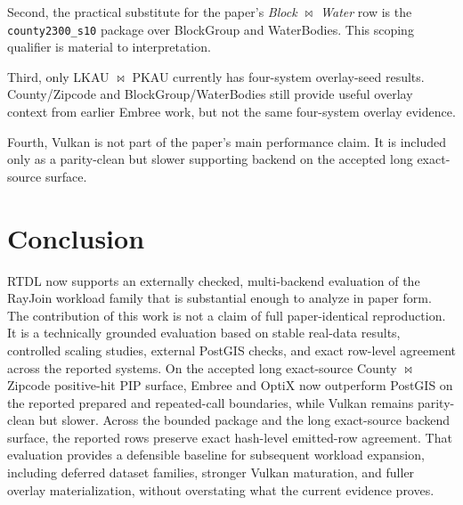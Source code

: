 \documentclass[conference]{IEEEtran}
\begin{document}
Second, the practical substitute for the paper's \textit{Block
$\bowtie$ Water} row is the \texttt{county2300\_s10} package over
BlockGroup and WaterBodies. This scoping qualifier is material to
interpretation.

Third, only LKAU $\bowtie$ PKAU currently has four-system overlay-seed
results. County/Zipcode and BlockGroup/WaterBodies still provide useful
overlay context from earlier Embree work, but not the same four-system overlay
evidence.

Fourth, Vulkan is not part of the paper's main performance claim. It is
included only as a parity-clean but slower supporting backend on the accepted
long exact-source surface.

\section{Conclusion}

RTDL now supports an externally checked, multi-backend evaluation of the
RayJoin workload family that is substantial enough to analyze in paper form.
The contribution of this work is not a claim of full paper-identical
reproduction. It is a technically grounded evaluation based on stable real-data
results, controlled scaling studies, external PostGIS checks, and exact
row-level agreement across the reported systems. On the accepted long
exact-source County $\bowtie$ Zipcode positive-hit PIP surface, Embree and
OptiX now outperform PostGIS on the reported prepared and repeated-call
boundaries, while Vulkan remains parity-clean but slower. Across the bounded
package and the long exact-source backend surface, the reported rows preserve
exact hash-level emitted-row agreement. That evaluation provides a defensible
baseline for subsequent workload expansion, including deferred dataset families,
stronger Vulkan maturation, and fuller overlay materialization, without
overstating what the current evidence proves.



\end{document}
